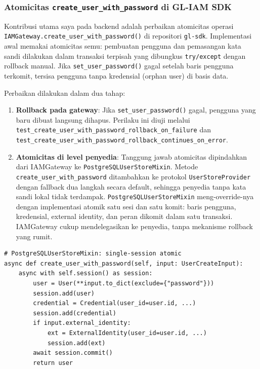 \subsubsection{Atomicitas \texttt{create\_user\_with\_password} di GL-IAM SDK}

Kontribusi utama saya pada backend adalah perbaikan atomicitas operasi \texttt{IAMGateway.create\_user\_with\_password()} di repositori \texttt{gl-sdk}. Implementasi awal memakai atomicitas semu: pembuatan pengguna dan pemasangan kata sandi dilakukan dalam transaksi terpisah yang dibungkus \texttt{try/except} dengan rollback manual. Jika \texttt{set\_user\_password()} gagal setelah baris pengguna terkomit, tersisa pengguna tanpa kredensial (orphan user) di basis data.

Perbaikan dilakukan dalam dua tahap:

\begin{enumerate}
    \item \textbf{Rollback pada gateway}: Jika \texttt{set\_user\_password()} gagal, pengguna yang baru dibuat langsung dihapus. Perilaku ini diuji melalui \texttt{test\_create\_user\_with\_password\_rollback\_on\_failure} dan \texttt{test\_create\_user\_with\_password\_rollback\_continues\_on\_error}.
    \item \textbf{Atomicitas di level penyedia}: Tanggung jawab atomicitas dipindahkan dari IAMGateway ke \texttt{PostgreSQLUserStoreMixin}. Metode \texttt{create\_user\_with\_password} ditambahkan ke protokol \texttt{UserStoreProvider} dengan fallback dua langkah secara default, sehingga penyedia tanpa kata sandi lokal tidak terdampak. \texttt{PostgreSQLUserStoreMixin} meng-override-nya dengan implementasi atomik satu sesi dan satu komit: baris pengguna, kredensial, external identity, dan peran dikomit dalam satu transaksi. IAMGateway cukup mendelegasikan ke penyedia, tanpa mekanisme rollback yang rumit.
\end{enumerate}

\begin{lstlisting}[caption={Implementasi atomic \texttt{create\_user\_with\_password} pada \texttt{PostgreSQLUserStoreMixin}}]
# PostgreSQLUserStoreMixin: single-session atomic
async def create_user_with_password(self, input: UserCreateInput):
    async with self.session() as session:
        user = User(**input.to_dict(exclude={"password"}))
        session.add(user)
        credential = Credential(user_id=user.id, ...)
        session.add(credential)
        if input.external_identity:
            ext = ExternalIdentity(user_id=user.id, ...)
            session.add(ext)
        await session.commit()
        return user
\end{lstlisting}

